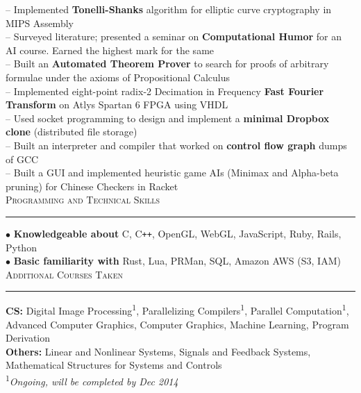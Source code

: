 \documentclass[a4paper,9pt]{article}
\begin{document}
-- Implemented \textbf{Tonelli-Shanks} algorithm for elliptic curve cryptography in MIPS Assembly\\
-- Surveyed literature; presented a seminar on \textbf{Computational Humor} for an AI course. Earned the highest mark for the same\\
-- Built an \textbf{Automated Theorem Prover} to search for proofs of arbitrary formulae under the axioms of Propositional Calculus\\
-- Implemented eight-point radix-2 Decimation in Frequency \textbf{Fast Fourier Transform} on Atlys Spartan 6 FPGA using VHDL\\
-- Used socket programming to design and implement a \textbf{minimal Dropbox clone} (distributed file storage)\\
-- Built an interpreter and compiler that worked on \textbf{control flow graph} dumps of GCC\\
-- Built a GUI and implemented heuristic game AIs (Minimax and Alpha-beta pruning) for Chinese Checkers in Racket\\

\large{\textsc{Programming and Technical Skills}}\vspace{1.5pt}
\hrule\vspace{0.25cm}
\small
$\bullet$ \textbf{Knowledgeable about} C, C\verb!++!, OpenGL, WebGL, JavaScript, Ruby, Rails, Python\\
$\bullet$ \textbf{Basic familiarity with} Rust, Lua, PRMan, SQL, Amazon AWS (S3, IAM)\\


\large{\textsc{Additional Courses Taken}}\vspace{1.5pt}
\hrule\vspace{0.25cm}
\small
\textbf{CS:} Digital Image Processing\textsuperscript{1}, Parallelizing Compilers\textsuperscript{1}, Parallel Computation\textsuperscript{1}, Advanced Computer Graphics, Computer Graphics, Machine Learning, Program Derivation\\
\textbf{Others:} Linear and Nonlinear Systems, Signals and Feedback Systems, Mathematical Structures for Systems and Controls\\
\null\hfill\textsuperscript{1}\emph{Ongoing, will be completed by Dec 2014}\\
\end{document}
